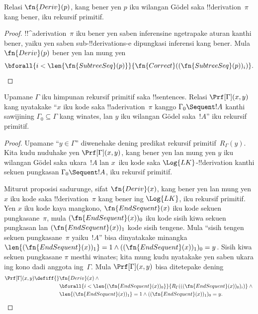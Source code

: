 \documentclass[../../../include/open-logic-section]{subfiles}
\begin{document}
\begin{prop}
  Relasi $\fn{Deriv}(p)$, kang bener yen $p$ iku wilangan G\"odel
  saka !!{derivation}~$\pi$ kang bener, iku rekursif primitif.
\end{prop}

\begin{proof}
  !!^a{derivation}~$\pi$ iku bener yen saben inferensine
  ngetrapake aturan kanthi bener, yaiku yen saben
  sub-!!{derivation}s-e dipungkasi inferensi kang bener.
  Mula $\fn{Deriv}(p)$ bener yen lan mung yen
  \[
  \bforall{i<\len{\fn{SubtreeSeq}(p)}}{\fn{Correct}((\fn{SubtreeSeq}(p))_i)}.
  \]
\end{proof}


\begin{prop}
Upamane $\Gamma$ iku himpunan rekursif primitif saka
!!{sentence}s. Relasi $\Prf[\Gamma](x, y)$ kang nyatakake
``$x$ iku kode saka !!a{derivation}~$\pi$ kanggo
$\Gamma_0 \Sequent !A$ kanthi sawijining $\Gamma_0 \subseteq \Gamma$
kang winates, lan $y$ iku wilangan G\"odel saka~$!A$''
iku rekursif primitif.
\end{prop}

\begin{proof}
Upamane ``$y \in \Gamma$'' diwenehake dening predikat
rekursif primitif~$R_\Gamma(y)$. Kita kudu nuduhake yen
$\Prf[\Gamma](x, y)$, kang bener yen lan mung yen $y$ iku
wilangan G\"odel saka ukara~$!A$ lan $x$~iku kode saka
$\Log{LK}$-!!{derivation} kanthi sekuen pungkasan
$\Gamma_0 \Sequent !A$, iku rekursif primitif.

Miturut proposisi sadurunge, sifat $\fn{Deriv}(x)$, kang bener
yen lan mung yen $x$ iku kode saka !!{derivation}~$\pi$ kang
bener ing $\Log{LK}$, iku rekursif primitif. Yen $x$ iku kode
kaya mangkono, $\fn{EndSequent}(x)$ iku kode sekuen pungkasane~$\pi$,
mula $(\fn{EndSequent}(x))_0$ iku kode sisih kiwa sekuen
pungkasan lan $(\fn{EndSequent}(x))_1$ kode sisih tengene.
Mula ``sisih tengen sekuen pungkasane~$\pi$ yaiku~$!A$'' bisa
dinyatakake minangka
$\len{(\fn{EndSequent}(x))_1} = 1 \land ((\fn{EndSequent}(x))_1)_0 =
y$. Sisih kiwa sekuen pungkasane $\pi$ mesthi winates;
kita mung kudu nyatakake yen saben ukara ing kono dadi anggota
ing~$\Gamma$. Mula $\Prf[\Gamma](x, y)$ bisa ditetepake dening
\begin{align*}
\Prf[\Gamma](x, y) \defiff {}&
\fn{Deriv}(x) \land {} \\
& \bforall{i <
  \len{(\fn{EndSequent}(x))_0}}{R_\Gamma(((\fn{EndSequent}(x))_0)_i)} \land {}\\
& \len{(\fn{EndSequent}(x))_1} = 1 \land ((\fn{EndSequent}(x))_1)_0 = y.
\end{align*}
\end{proof}
\end{document}
